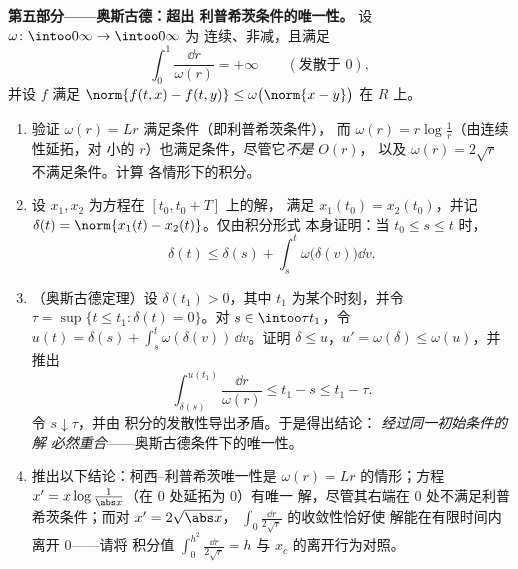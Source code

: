 \begin{problem}[{周末问题——无利普希茨条件时
$x' = f(t, x)$ 解的存在性}]
\medskip
\noindent\textbf{第五部分——奥斯古德：超出
利普希茨条件的唯一性。} 设 $\omega\colon\intoo0\infty\to\intoo0\infty$ 为
连续、非减，且满足
\[
\int_0^1\frac{\dd r}{\omega(r)} = +\infty
\qquad(\text{发散于 } 0),
\]
并设 $f$ 满足 $\norm{f(t, x) - f(t, y)} \leq
\omega\bigl(\norm{x - y}\bigr)$ 在 $R$ 上。
\begin{enumerate}[resume]
  \item 验证 $\omega(r) = Lr$ 满足条件（即利普希茨条件），
        而 $\omega(r) = r\log\frac1r$（由连续性延拓，对
        小的 $r$）也满足条件，尽管它\emph{不是} $O(r)$，
        以及 $\omega(r) = 2\sqrt r$ 不满足条件。计算
        各情形下的积分。
  \item 设 $x_1, x_2$ 为方程在 $[t_0, t_0 + T]$ 上的解，
        满足 $x_1(t_0) = x_2(t_0)$，并记 $\delta(t) =
        \norm{x_1(t) - x_2(t)}$。仅由积分形式
        本身证明：当 $t_0 \leq s \leq t$ 时，
        \[
        \delta(t) \leq \delta(s) +
        \int_s^t\omega\bigl(\delta(v)\bigr)\dd v .
        \]
  \item （奥斯古德定理）设 $\delta(t_1) > 0$，其中
        $t_1$ 为某个时刻，并令 $\tau = \sup\{t \leq t_1 : \delta(t) =
        0\}$。对 $s \in \intoo\tau{t_1}$，令 $u(t) = \delta(s)
        + \int_s^t\omega(\delta(v))\,\dd v$。证明 $\delta \leq
        u$，$u' = \omega(\delta) \leq \omega(u)$，并推出
        \[
        \int_{\delta(s)}^{u(t_1)}\frac{\dd r}{\omega(r)}
        \leq t_1 - s \leq t_1 - \tau .
        \]
        令 $s \downarrow \tau$，并由
        积分的发散性导出矛盾。于是得出结论：
        \emph{经过同一初始条件的解
        必然重合}——奥斯古德条件下的唯一性。
  \item 推出以下结论：柯西--利普希茨唯一性是
        $\omega(r) = Lr$ 的情形；方程 $x' =
        x\log\frac1{\abs x}$（在 $0$ 处延拓为 $0$）有唯一
        解，尽管其右端在
        $0$ 处不满足利普希茨条件；而对 $x' = 2\sqrt{\abs x}$，
        $\int_0\frac{\dd r}{2\sqrt r}$ 的收敛性恰好使
        解能在有限时间内离开 $0$——请将
        积分值 $\int_0^{h^2}\frac{\dd r}{2\sqrt r} = h$
        与 $x_c$ 的离开行为对照。
\end{enumerate}


\end{problem}

